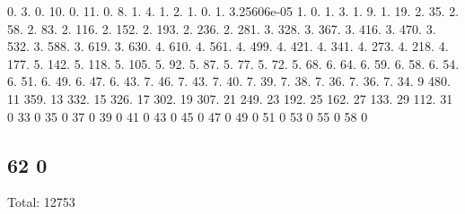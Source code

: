 0. 3. 0. 10. 0. 11. 0. 8. 1. 4. 1. 2. 1. 0. 1. 3.\+25606e-\/05 1. 0. 1. 3. 1. 9. 1. 19. 2. 35. 2. 58. 2. 83. 2. 116. 2. 152. 2. 193. 2. 236. 2. 281. 3. 328. 3. 367. 3. 416. 3. 470. 3. 532. 3. 588. 3. 619. 3. 630. 4. 610. 4. 561. 4. 499. 4. 421. 4. 341. 4. 273. 4. 218. 4. 177. 5. 142. 5. 118. 5. 105. 5. 92. 5. 87. 5. 77. 5. 72. 5. 68. 6. 64. 6. 59. 6. 58. 6. 54. 6. 51. 6. 49. 6. 47. 6. 43. 7. 46. 7. 43. 7. 40. 7. 39. 7. 38. 7. 36. 7. 36. 7. 34. 9 480. 11 359. 13 332. 15 326. 17 302. 19 307. 21 249. 23 192. 25 162. 27 133. 29 112. 31 0 33 0 35 0 37 0 39 0 41 0 43 0 45 0 47 0 49 0 51 0 53 0 55 0 58 0 \subsection*{62 0 }

Total\+: 12753 